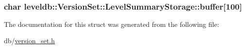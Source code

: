 \subsubsection[{buffer}]{\setlength{\rightskip}{0pt plus 5cm}char leveldb\+::\+Version\+Set\+::\+Level\+Summary\+Storage\+::buffer\mbox{[}100\mbox{]}}\label{structleveldb_1_1_version_set_1_1_level_summary_storage_a90b283461affa0f25f41bc21a9c81bbc}


The documentation for this struct was generated from the following file\+:\begin{DoxyCompactItemize}
\item 
db/\hyperlink{version__set_8h}{version\+\_\+set.\+h}\end{DoxyCompactItemize}
